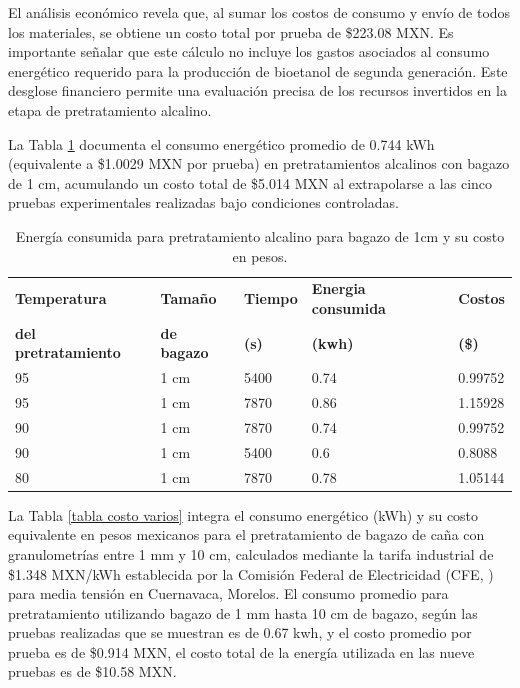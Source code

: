 \documentclass[12pt]{article}
\begin{document}
    El análisis económico revela que, al sumar los costos de consumo y envío de todos los materiales, se obtiene un costo total por prueba de \$223.08 MXN. Es importante señalar que este cálculo no incluye los gastos asociados al consumo energético requerido para la producción de bioetanol de segunda generación. Este desglose financiero permite una evaluación precisa de los recursos invertidos en la etapa de pretratamiento alcalino.
			
La Tabla \ref{tabla costo 1 cm} documenta el consumo energético promedio de 0.744 kWh (equivalente a \$1.0029 MXN por prueba) en pretratamientos alcalinos con bagazo de 1 cm, acumulando un costo total de \$5.014 MXN al extrapolarse a las cinco pruebas experimentales realizadas bajo condiciones controladas.
			
			
\begin{table}[H]
	\centering
	\caption{Energía consumida para pretratamiento alcalino para bagazo de 1cm y su costo en pesos. }
	\label{tabla costo 1 cm}
	\resizebox{12cm}{!} {
	\begin{tabular}{|l|l|l|l|l|}
		\hline
		\textbf{Temperatura} & \textbf{Tamaño } & \textbf{Tiempo} & \textbf{Energia consumida} & \textbf{Costos } \\ 
		\textbf{del pretratamiento} &	\textbf{ de bagazo}  &	\textbf{ (s)} & 	\textbf{(kwh) }& 	\textbf{(\$)} \\ \hline
		95 & 1 cm & 5400 & 0.74 & 0.99752  \\ \hline
		95 & 1 cm & 7870 & 0.86 & 1.15928  \\ \hline
		90 & 1 cm & 7870 & 0.74 & 0.99752  \\ \hline
		90 & 1 cm & 5400 & 0.6 & 0.8088  \\ \hline
		80 & 1 cm & 7870 & 0.78 & 1.05144  \\ \hline
		
	
	\end{tabular}}
		
\end{table}

La Tabla \ref{tabla costo varios} integra el consumo energético (kWh) y su costo equivalente en pesos mexicanos para el pretratamiento de bagazo de caña con granulometrías entre 1 mm y 10 cm, calculados mediante la tarifa industrial de \$1.348 MXN/kWh establecida por la Comisión Federal de Electricidad (CFE, \cite{CFE2023}) para media tensión en Cuernavaca, Morelos. El consumo promedio para pretratamiento utilizando bagazo de 1 mm hasta 10 cm de bagazo, según las pruebas realizadas que se muestran es de 0.67 kwh, y el costo promedio por prueba es de \$0.914 MXN, el costo total de la energía utilizada en las nueve pruebas es de \$10.58 MXN.
\end{document}
